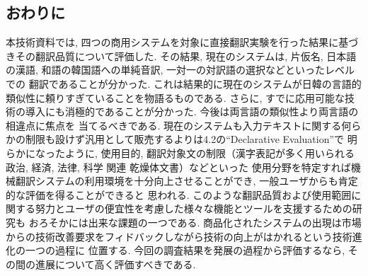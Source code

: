\subsection{おわりに}
 本技術資料では, 四つの商用システムを対象に直接翻訳実験を行った結果に基づきその翻訳品質について評価した. 
その結果, 現在のシステムは, 片仮名, 日本語の漢語, 和語の韓国語への単純音訳, 一対一の対訳語の選択などといったレベルでの
翻訳であることが分かった. これは結果的に現在のシステムが日韓の言語的類似性に頼りすぎていることを物語るものである. 
さらに, すでに応用可能な技術の導入にも消極的であることが分かった. 今後は両言語の類似性より両言語の相違点に焦点を
当てるべきである. 
  現在のシステムも入力テキストに関する何らかの制限も設けず汎用として販売するよりは4.2の“Declarative Evaluation”で
明らかになったように, 使用目的, 翻訳対象文の制限（漢字表記が多く用いられる政治, 経済, 法律, 科学 関連 乾燥体文書）などといった
使用分野を特定すれば機械翻訳システムの利用環境を十分向上させることができ, 一般ユーザからも肯定的な評価を得ることができると
思われる. このような翻訳品質および使用範囲に関する努力とユーザの便宜性を考慮した様々な機能とツールを支援するための研究も
おろそかには出来な課題の一つである. 
商品化されたシステムの出現は市場からの技術改善要求をフィドバックしながら技術の向上がはかれるという技術進化の一つの過程に
位置する. 今回の調査結果を発展の過程から評価するなら, その間の進展について高く評価すべきである. 













\begin{biography}







\end{biography}




